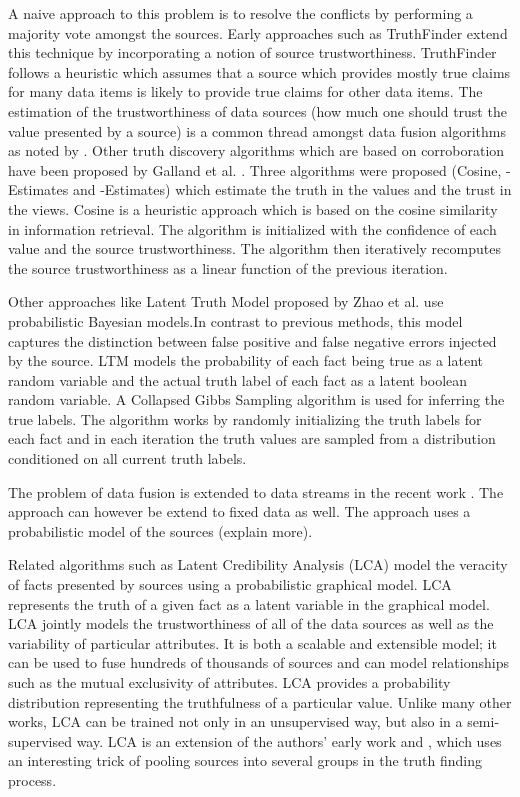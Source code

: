 \documentclass{acm_proc_article-sp}
\begin{document}
A naive approach to this problem is to resolve the conflicts by performing a majority vote amongst the sources. Early approaches such as {\sc TruthFinder} \cite{yin:truth} extend this technique by incorporating a notion of source trustworthiness. {\sc TruthFinder} follows a heuristic which assumes that a source which provides mostly true claims for many data items is likely to provide true claims for other data items. The estimation of the trustworthiness of data sources (how much one should trust the value presented by a source)  is a common thread amongst data fusion algorithms as noted by \cite{li:truth} \cite{waguih:truth}. Other truth discovery algorithms which are based on corroboration have been proposed by Galland et al. \cite{galland:corro}. Three algorithms were proposed ({\sc Cosine}, {-Estimates} and {-Estimates}) which estimate the truth in the values and the trust in the views. {\sc Cosine} is a heuristic approach which is based on the cosine similarity in information retrieval. The algorithm is initialized with the confidence of each value and the source trustworthiness. The algorithm then iteratively recomputes the source trustworthiness as a linear function of the previous iteration. 


Other approaches like Latent Truth Model proposed by Zhao et al. \cite{zhao:bayesian} use probabilistic Bayesian models.In contrast to previous methods, this model captures the distinction between false positive and false negative errors injected by the source. LTM models the probability of each fact being true as a latent random variable and the actual truth label of each fact as a latent boolean random variable. A Collapsed Gibbs Sampling algorithm is used for inferring the true labels. The algorithm works by randomly initializing the truth labels for each fact and in each iteration the truth values are sampled from a distribution conditioned on all current truth labels. 

The problem of data fusion is extended to data streams in the recent work \cite{zhao:truth}. The approach can however be extend to fixed data as well. The approach uses a probabilistic model of the sources (explain more). 

Related algorithms such as Latent Credibility Analysis (LCA) \cite{pasternack:latent} model the veracity of facts presented by sources using a probabilistic graphical model. LCA represents the truth of a given fact as a latent variable in the graphical model. LCA jointly models the trustworthiness of all of the data sources as well as the variability of particular attributes. It is both a scalable and extensible model; it can be used to fuse hundreds of thousands of sources and can model relationships such as the mutual exclusivity of attributes. LCA provides a probability distribution representing the truthfulness of a particular value. Unlike many other works, LCA can be trained not only in an unsupervised way, but also in a semi-supervised way. LCA is an extension of the authors' early work \cite{pasternack:knowing} and \cite{pasternack:making}, which uses an interesting trick of pooling sources into several groups in the truth finding process. 
\end{document}
